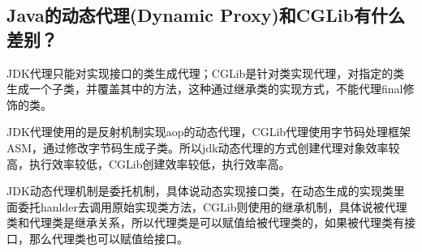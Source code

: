 \documentclass[../../../interview-questions.tex]{subfiles}
\begin{document}
\subsection{Java的动态代理(Dynamic Proxy)和CGLib有什么差别？}

JDK代理只能对实现接口的类生成代理；CGLib是针对类实现代理，对指定的类生成一个子类，并覆盖其中的方法，这种通过继承类的实现方式，不能代理final修饰的类。

JDK代理使用的是反射机制实现aop的动态代理，CGLib代理使用字节码处理框架ASM，通过修改字节码生成子类。所以jdk动态代理的方式创建代理对象效率较高，执行效率较低，CGLib创建效率较低，执行效率高。

JDK动态代理机制是委托机制，具体说动态实现接口类，在动态生成的实现类里面委托hanlder去调用原始实现类方法，CGLib则使用的继承机制，具体说被代理类和代理类是继承关系，所以代理类是可以赋值给被代理类的，如果被代理类有接口，那么代理类也可以赋值给接口。
\end{document}
